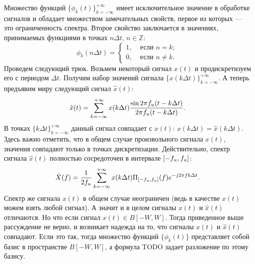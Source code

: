 \documentclass{book}
\numberwithin{theorem}{chapter}
\numberwithin{statement}{chapter}
\numberwithin{lemma}{chapter}
\theoremstyle{definition}
\numberwithin{task}{chapter}
\theoremstyle{remark}
\numberwithin{example}{chapter}
\theoremstyle{definition}
\numberwithin{definition}{chapter}
\theoremstyle{remark}
\theoremstyle{remark}
\numberwithin{lyrics}{section}
\begin{document}
Множество функций $\{\phi_k(t)\}_{k=-\infty}^{+\infty}$ имеет исключительное значение в обработке сигналов и обладает множеством замечательных свойств, первое из которых --- это ограниченность спектра. Второе свойство заключается в значениях, принимаемых функциями в точках $n\Delta t$, $n \in \mathbb{Z}$:
\begin{equation}
\phi_k(n \Delta t) = 
\begin{cases}
	1, &\text{ если } n = k; \\
	0, &\text{ если } n \neq k.
\end{cases}
\end{equation}
Проведем следующий трюк. Возьмем некоторый сигнал $x(t)$ и продискретизуем его с периодом $\Delta t$. Получим набор значений сигнала $\{x(k\Delta t)\}_{k=-\infty}^{+\infty}$. А теперь предъявим миру следующий сигнал $\hat{x}(t)$:
\begin{equation}
\hat{x}(t) = \sum\limits_{k=-\infty}^{+\infty} x(k\Delta t) \frac{\sin 2\pi f_u (t - k\Delta t)}{2\pi f_u (t - k\Delta t)}.
\end{equation}
В точках $\{k\Delta t\}_{k=-\infty}^{+\infty}$ данный сигнал совпадает с $x(t)$: $x(k\Delta t) = \hat{x}(k\Delta t)$. Здесь важно отметить, что в общем случае произвольного сигнала $x(t)$, значения совпадают только в точках дискретизации. Действительно, спектр сигнала $\hat{x}(t)$ полностью сосредоточен в интервале $[-f_{u}, f_{u}]$:
$$
\hat{X}(f) = \frac{1}{2f_{u}}\sum\limits_{k =-\infty}^{+\infty} x(k\Delta t) \Pi_{[-f_{u}, f_{u}]}(f) e^{-j2\pi f k \Delta t}.
$$
Спектр же сигнала $x(t)$ в общем случае неограничен (ведь в качестве $x(t)$ можем взять любой сигнал). А значит и в целом сигналы $x(t)$ и $\hat{x}(t)$ отличаются. Но что если сигнал $x(t) \in B[-W, W]$. Тогда приведенное выше рассуждение не верно, и возникает надежда на то, что сигналы $x(t)$ и $\hat{x}(t)$ совпадают. Если это так, тогда множество функций $\{\phi_k(t)\}$ представляет собой базис в пространстве $B[-W,W]$, а формула TODO задает разложение по этому базису. 
\end{document}
